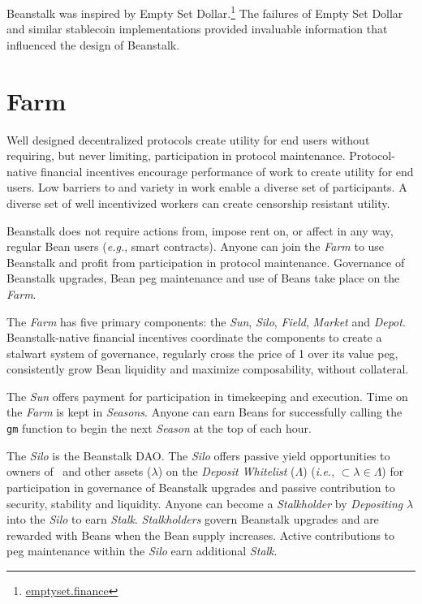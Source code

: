 \documentclass[tikz]{article}
\newcommand{\code}[1]{\texttt{#1}}
\newcommand{\term}[1]{\textsl{#1}}
\newcommand{\fref}[1]{\footnote{\href{http://#1}{#1}}}
\newcommand{\Bean}{} %
\begin{document}
Beanstalk was inspired by Empty Set Dollar.\fref{emptyset.finance} The failures of Empty Set Dollar and similar stablecoin implementations provided invaluable information that influenced the design of Beanstalk.

\section{Farm}
Well designed decentralized protocols create utility for end users without requiring, but never limiting, participation in protocol maintenance. Protocol-native financial incentives encourage performance of work to create utility for end users. Low barriers to and variety in work enable a diverse set of participants. A diverse set of well incentivized workers can create censorship resistant utility. 

Beanstalk does not require actions from, impose rent on, or affect in any way, regular Bean users (\term{e.g.}, smart contracts). Anyone can join the \term{Farm} to use Beanstalk and profit from participation in protocol maintenance. Governance of Beanstalk upgrades, Bean peg maintenance and use of Beans take place on the \term{Farm}.

The \term{Farm} has five primary components: the \term{Sun}, \term{Silo}, \term{Field}, \term{Market} and \term{Depot}. Beanstalk-native financial incentives coordinate the components to create a stalwart system of governance, regularly cross the price of \Bean1 over its value peg, consistently grow Bean liquidity and maximize composability, without collateral.

The \term{Sun} offers payment for participation in timekeeping and execution. Time on the \term{Farm} is kept in \term{Seasons}. Anyone can earn Beans for successfully calling the \code{gm} function to begin the next \term{Season} at the top of each hour.

The \term{Silo} is the Beanstalk DAO. The \term{Silo} offers passive yield opportunities to owners of \Bean\ and other assets (\hyperlink{ht126}{$\lambda$}) on the \term{Deposit Whitelist} (\hyperlink{ht127}{$\Lambda$}) (\term{i.e.}, $\Bean \subset \lambda \in \Lambda$) for participation in governance of Beanstalk upgrades and passive contribution to security, stability and liquidity. Anyone can become a \term{Stalkholder} by \term{Depositing} \hyperlink{ht126}{$\lambda$} into the \term{Silo} to earn \term{Stalk}. \term{Stalkholders} govern Beanstalk upgrades and are rewarded with Beans when the Bean supply increases. Active contributions to peg maintenance within the \term{Silo} earn additional \term{Stalk}.
\end{document}
